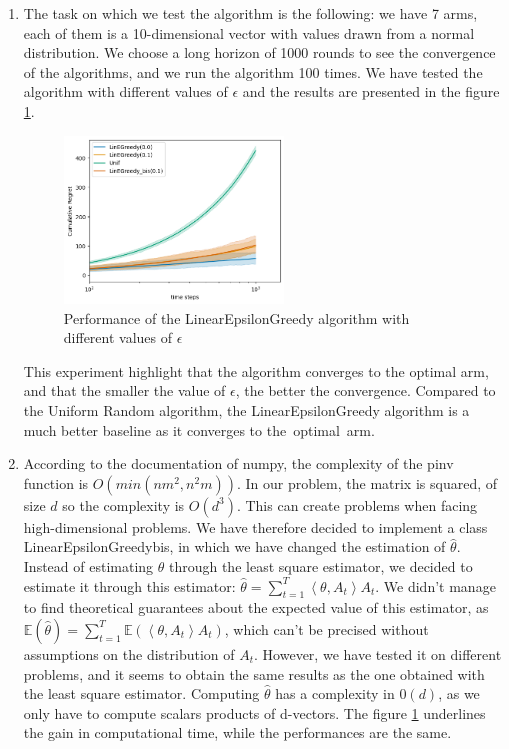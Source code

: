 \begin{enumerate}
        
    \item  The task on which we test the algorithm is the following: we have 7 arms, each of them is a 10-dimensional vector with values drawn from a normal distribution. 
    We choose a long horizon of 1000 rounds to see the convergence of the algorithms, and we run the algorithm 100 times.
    We have tested the algorithm with different values of $\epsilon$ and the results are presented in the figure \ref{fig:lin_epsilon_greedy}.
    \begin{figure}[h]
      \centering
      \includegraphics[width=0.55\textwidth]{images/lin_epsilon_greedy.png}
      \caption{Performance of the LinearEpsilonGreedy algorithm with different values of $\epsilon$}
      \label{fig:lin_epsilon_greedy}
    \end{figure}
    This experiment highlight that the algorithm converges to the optimal arm, and that the smaller the value of $\epsilon$, the better the convergence.
    Compared to the Uniform Random algorithm, the LinearEpsilonGreedy algorithm is a much better baseline as it converges to the optimal arm.
    \item According to the documentation of numpy, the complexity of the pinv function is $O(min(n m^2, n^2m))$. In our problem, the matrix is squared, of size $d$ so the complexity is $O(d^3)$.
This can create problems when facing high-dimensional problems. We have therefore decided to implement a class LinearEpsilonGreedybis, in which we have changed the estimation of $\hat{\theta}$. 
Instead of estimating $\theta$ through the least square estimator, we decided to estimate it through this estimator: $\hat{\theta} = \sum_{t=1}^{T} \left\langle \theta , A_t\right\rangle A_t$. 
We didn't manage to find theoretical guarantees about the expected value of this estimator, as $\mathbb{E}(\hat{\theta}) = \sum_{t=1}^{T} \mathbb{E} ( \left\langle \theta , A_t\right\rangle A_t) $, which can't be precised without assumptions on the distribution of $A_t$.
However, we have tested it on different problems, and it seems to obtain the same results as the one obtained with the least square estimator.
Computing $\hat{\theta}$ has a complexity in $0(d)$, as we only have to compute scalars products of d-vectors. The figure \ref{fig:lin_epsilon_greedy} underlines the gain in computational time, while the performances are the same.


\end{enumerate}
